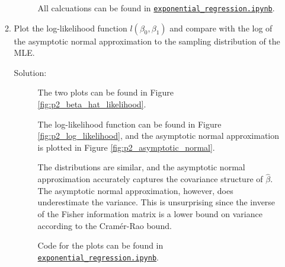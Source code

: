 \documentclass[letterpaper,11pt]{article}
\begin{document}
\begin{enumerate}
\begin{enumerate}
\begin{description}
      All calcuations can be found in
      \href{https://nbviewer.jupyter.org/github/ppham27/stat570/blob/master/hw2/exponential\_regression.ipynb}{\texttt{exponential\_regression.ipynb}}.
    \end{description}
  \item Plot the log-likelihood function $l\left(\beta_0,\beta_1\right)$ and
    compare with the log of the asymptotic normal approximation to the sampling
    distribution of the MLE.
    \label{part:2d}

    \begin{description}
    \item[Solution:] The two plots can be found in Figure
      \ref{fig:p2_beta_hat_likelihood}.

      The log-likelihood function can be found in Figure
      \ref{fig:p2_log_likelihood}, and the asymptotic normal approximation is
      plotted in Figure \ref{fig:p2_asymptotic_normal}.

      The distributions are similar, and the asymptotic normal approximation
      accurately captures the covariance structure of $\hat{\beta}$.  The
      asymptotic normal approximation, however, does underestimate the
      variance. This is unsurprising since the inverse of the Fisher information
      matrix is a lower bound on variance according to the Cram\'er-Rao bound.

      Code for the plots can be found in
      \href{https://nbviewer.jupyter.org/github/ppham27/stat570/blob/master/hw2/exponential\_regression.ipynb}{\texttt{exponential\_regression.ipynb}}.
      

\end{description}
\end{enumerate}
\end{enumerate}
\end{document}
